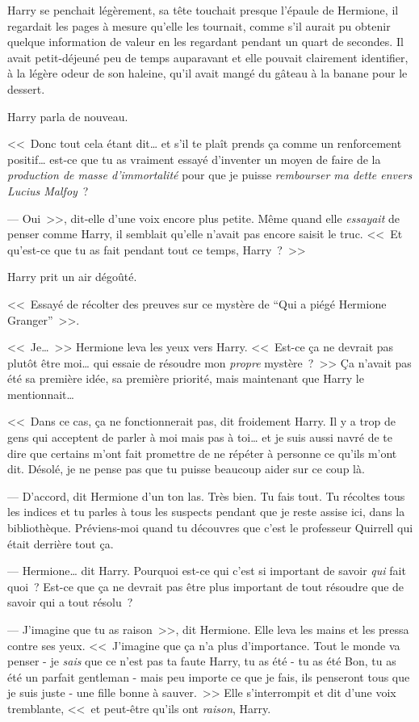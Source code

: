 Harry se penchait légèrement, sa tête touchait presque l'épaule de Hermione, il regardait les pages à mesure qu'elle les tournait, comme s'il aurait pu obtenir quelque information de valeur en les regardant pendant un quart de secondes. Il avait petit-déjeuné peu de temps auparavant et elle pouvait clairement identifier, à la légère odeur de son haleine, qu'il avait mangé du gâteau à la banane pour le dessert.

Harry parla de nouveau.

<<~Donc tout cela étant dit… et s'il te plaît prends ça comme un renforcement positif… est-ce que tu as vraiment essayé d'inventer un moyen de faire de la \emph{production de masse d'immortalité} pour que je puisse \emph{rembourser ma dette envers Lucius Malfoy}~?

--- Oui~>>, dit-elle d'une voix encore plus petite. Même quand elle \emph{essayait} de penser comme Harry, il semblait qu'elle n'avait pas encore saisit le truc. <<~Et qu'est-ce que tu as fait pendant tout ce temps, Harry~?~>>

Harry prit un air dégoûté.

<<~Essayé de récolter des preuves sur ce mystère de “Qui a piégé Hermione Granger”~>>.

<<~Je…~>> Hermione leva les yeux vers Harry. <<~Est-ce ça ne devrait pas plutôt être moi… qui essaie de résoudre mon \emph{propre} mystère~?~>> Ça n'avait pas été sa première idée, sa première priorité, mais maintenant que Harry le mentionnait…

<<~Dans ce cas, ça ne fonctionnerait pas, dit froidement Harry. Il y a trop de gens qui acceptent de parler à moi mais pas à toi… et je suis aussi navré de te dire que certains m'ont fait promettre de ne répéter à personne ce qu'ils m'ont dit. Désolé, je ne pense pas que tu puisse beaucoup aider sur ce coup là.

--- D'accord, dit Hermione d'un ton las. Très bien. Tu fais tout. Tu récoltes tous les indices et tu parles à tous les suspects pendant que je reste assise ici, dans la bibliothèque. Préviens-moi quand tu découvres que c'est le professeur Quirrell qui était derrière tout ça.

--- Hermione… dit Harry. Pourquoi est-ce qui c'est si important de savoir \emph{qui} fait quoi~? Est-ce que ça ne devrait pas être plus important de tout résoudre que de savoir qui a tout résolu~?

--- J'imagine que tu as raison~>>, dit Hermione. Elle leva les mains et les pressa contre ses yeux. <<~J'imagine que ça n'a plus d'importance. Tout le monde va penser - je \emph{sais} que ce n'est pas ta faute Harry, tu as été - tu as été Bon, tu as été un parfait gentleman - mais peu importe ce que je fais, ils penseront tous que je suis juste - une fille bonne à sauver.~>> Elle s'interrompit et dit d'une voix tremblante, <<~et peut-être qu'ils ont \emph{raison}, Harry.

